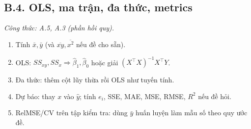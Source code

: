 \subsection*{B.4. OLS, ma trận, đa thức, metrics}
\textit{Công thức: A.5, A.3 (phần hồi quy).}
\begin{enumerate}
  \item Tính \(\bar x,\bar y\) (và \(\overline{xy},\overline{x^2}\) nếu đề cho sẵn).
  \item OLS: \(SS_{xy},SS_x\Rightarrow\hat\beta_1,\hat\beta_0\) hoặc giải \((X^\top X)^{-1}X^\top Y\).
  \item Đa thức: thêm cột lũy thừa rồi OLS như tuyến tính.
  \item Dự báo: thay \(x\) vào \(\hat y\); tính \(e_i\), SSE, MAE, MSE, RMSE, \(R^2\) nếu đề hỏi.
  \item RelMSE/CV trên tập kiểm tra: dùng \(\bar y\) huấn luyện làm mẫu số theo quy ước đề.
\end{enumerate}
